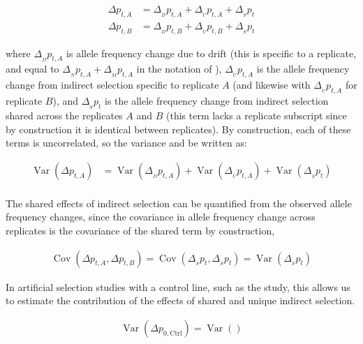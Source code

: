 \documentclass[11pt]{article}
\DeclareMathOperator{\var}{Var}
\DeclareMathOperator{\cov}{Cov}
\begin{document}
\begin{align}
  \Delta p_{t,A} &= \Delta_{_D} p_{t,A} + \Delta_{_{U}} p_{t,A} + \Delta_{_S} p_t \\
  \Delta p_{t,B} &= \Delta_{_D} p_{t,B} + \Delta_{_{U}} p_{t,B} + \Delta_{_S} p_t
\end{align}

where $\Delta_{_D} p_{t,A}$ is allele frequency change due to drift (this is
specific to a replicate, and equal to $\Delta_{_N} p_{t,A} + \Delta_{_M}
p_{t,A}$ in the notation of \cite{Buffalo2019-io}), $\Delta_{_{U}} p_{t,A}$ is
the allele frequency change from indirect selection specific to replicate $A$
(and likewise with $\Delta_{_{U}} p_{t,A}$ for replicate $B$), and $\Delta_{_S}
p_t$ is the allele frequency change from indirect selection shared across the
replicates $A$ and $B$ (this term lacks a replicate subscript since by
construction it is identical between replicates). By construction, each of
these terms is uncorrelated, so the variance and be written as:

\begin{align}
  \var(\Delta p_{t,A}) &= \var(\Delta_{_D} p_{t,A}) + \var(\Delta_{_{U}} p_{t,A}) + \var(\Delta_{_S} p_t) \\
\end{align}

The shared effects of indirect selection can be quantified from the observed
allele frequency changes, since the covariance in allele frequency change
across replicates is the covariance of the shared term by construction, 

\begin{align}
  \cov(\Delta p_{t,A}, \Delta p_{t,B}) = \cov(\Delta_{_S} p_{t}, \Delta_{_S} p_{t}) = \var(\Delta_{_S} p_{t})
\end{align}

In artificial selection studies with a control line, such as the
\textcite{Castro2019-uk} study, this allows us to estimate the contribution of
the effects of shared and unique indirect selection. 

\begin{align}
  \var(\Delta p_{0,\mathrm{Ctrl}}) = \var()
\end{align}


\end{document}
